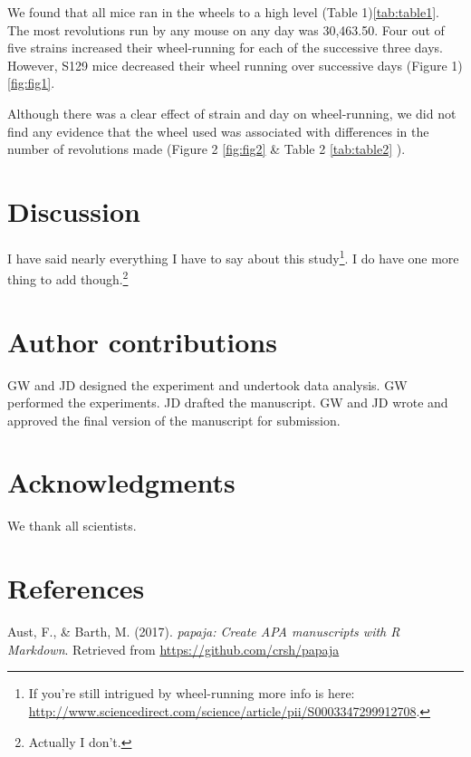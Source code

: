 \documentclass[english,man]{apa6}
\newcounter{author}
\theoremstyle{definition}
\theoremstyle{definition}
\theoremstyle{definition}
\theoremstyle{remark}
\begin{document}
We found that all mice ran in the wheels to a high level (Table
1)\ref{tab:table1}. The most revolutions run by any mouse on any day was
30,463.50. Four out of five strains increased their wheel-running for
each of the successive three days. However, S129 mice decreased their
wheel running over successive days (Figure 1) \ref{fig:fig1}.

Although there was a clear effect of strain and day on wheel-running, we
did not find any evidence that the wheel used was associated with
differences in the number of revolutions made (Figure 2 \ref{fig:fig2}
\& Table 2 \ref{tab:table2} ).

\section{Discussion}\label{discussion}

I have said nearly everything I have to say about this study\footnote{If
  you're still intrigued by wheel-running more info is here:
  \url{http://www.sciencedirect.com/science/article/pii/S0003347299912708}.}.
I do have one more thing to add though.\footnote{Actually I don't.}

\section{Author contributions}\label{author-contributions}

GW and JD designed the experiment and undertook data analysis. GW
performed the experiments. JD drafted the manuscript. GW and JD wrote
and approved the final version of the manuscript for submission.

\section{Acknowledgments}\label{acknowledgments}

We thank all scientists.

\newpage

\section{References}\label{references}

\setlength{\parindent}{-0.5in} \setlength{\leftskip}{0.5in}

\hypertarget{refs}{}
\hypertarget{ref-R-papaja}{}
Aust, F., \& Barth, M. (2017). \emph{papaja: Create APA manuscripts with
R Markdown}. Retrieved from \url{https://github.com/crsh/papaja}
\end{document}
